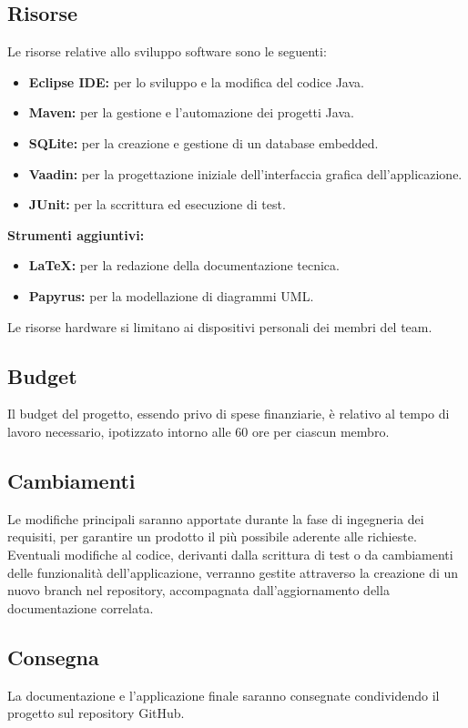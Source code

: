 \documentclass[a4paper,12pt]{article}
\begin{document}
\subsection{Risorse} %
Le risorse relative allo sviluppo software sono le seguenti:
\begin{itemize}
    \item \textbf{Eclipse IDE:} per lo sviluppo e la modifica del codice Java.
    \item \textbf{Maven:} per la gestione e l’automazione dei progetti Java.
    \item \textbf{SQLite:} per la creazione e gestione di un database embedded.
    \item \textbf{Vaadin:} per la progettazione iniziale dell’interfaccia grafica dell’applicazione.
    \item \textbf{JUnit:} per la sccrittura ed esecuzione di test. 
\end{itemize}

\textbf{Strumenti aggiuntivi:}
\begin{itemize}
    \item \textbf{LaTeX:} per la redazione della documentazione tecnica.
    \item \textbf{Papyrus:} per la modellazione di diagrammi UML.
\end{itemize}

Le risorse hardware si limitano ai dispositivi personali dei membri del team.

\subsection{Budget} %
Il budget del progetto, essendo privo di spese finanziarie, è relativo al tempo di lavoro necessario, ipotizzato intorno alle 60 ore per ciascun membro. 

\subsection{Cambiamenti} %
Le modifiche principali saranno apportate durante la fase di ingegneria dei requisiti, per garantire un prodotto il più possibile aderente alle richieste. Eventuali modifiche al codice, derivanti dalla scrittura di test o da cambiamenti delle funzionalità dell'applicazione, verranno gestite attraverso la creazione di un nuovo branch nel repository, accompagnata dall'aggiornamento della documentazione correlata.

\subsection{Consegna} %
La documentazione e l'applicazione finale saranno consegnate condividendo il progetto sul repository GitHub.
\end{document}
